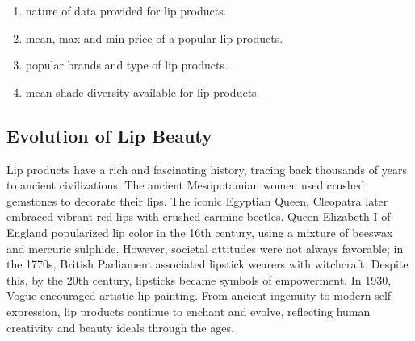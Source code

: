 \documentclass{article}
\begin{document}
\begin{enumerate}
    \item nature of data provided for lip products.
    \item mean, max and min price of a popular lip products.
    \item popular brands and type of lip products.
    \item mean shade diversity available for lip products.
\end{enumerate}

\subsection{Evolution of Lip Beauty}

Lip products have a rich and fascinating history, tracing back thousands of years to ancient civilizations. The ancient Mesopotamian women used crushed gemstones to decorate their lips. The iconic Egyptian Queen, Cleopatra later embraced vibrant red lips with crushed carmine beetles. Queen Elizabeth I of England popularized lip color in the 16th century, using a mixture of beeswax and mercuric sulphide. However, societal attitudes were not always favorable; in the 1770s, British Parliament associated lipstick wearers with witchcraft. Despite this, by the 20th century, lipsticks became symbols of empowerment. In 1930, Vogue encouraged artistic lip painting. From ancient ingenuity to modern self-expression, lip products continue to enchant and evolve, reflecting human creativity and beauty ideals through the ages.
\end{document}
